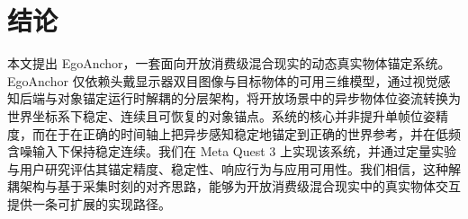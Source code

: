 \documentclass[review]{vgtc}
\begin{document}
\section{结论}\label{sec:conclusion}


本文提出 EgoAnchor，一套面向开放消费级混合现实的动态真实物体锚定系统。EgoAnchor 仅依赖头戴显示器双目图像与目标物体的可用三维模型，通过视觉感知后端与对象锚定运行时解耦的分层架构，将开放场景中的异步物体位姿流转换为世界坐标系下稳定、连续且可恢复的对象锚点。系统的核心并非提升单帧位姿精度，而在于在正确的时间轴上把异步感知稳定地锚定到正确的世界参考，并在低频含噪输入下保持稳定连续。我们在 Meta Quest 3 上实现该系统，并通过定量实验与用户研究评估其锚定精度、稳定性、响应行为与应用可用性。我们相信，这种解耦架构与基于采集时刻的对齐思路，能够为开放消费级混合现实中的真实物体交互提供一条可扩展的实现路径。
\end{document}
